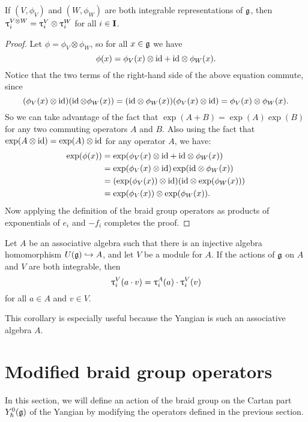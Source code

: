 \begin{proposition}\label{P:tau-tensor}
    If $(V,\phi_V)$ and $(W,\phi_W)$ are both integrable representations of $\g$, then $\braid_i^{V\otimes W} = \braid_i^V\otimes\braid_i^W$ for all $i\in\I$.
\end{proposition}
\begin{proof}
    Let $\phi=\phi_V\otimes\phi_W$, so for all $x\in\g$ we have
    \[\phi(x) = \phi_V(x)\otimes{\id} + {\id}\otimes\phi_W(x).\]
    Notice that the two terms of the right-hand side of the above equation commute, since
    \[(\phi_V(x)\otimes{\id})(\id\otimes\phi_W(x)) = ({\id}\otimes\phi_W(x))(\phi_V(x)\otimes{\id}) = \phi_V(x)\otimes\phi_W(x).\]
    So we can take advantage of the fact that $\exp(A+B)=\exp(A)\exp(B)$ for any two commuting operators $A$ and $B$.
    Also using the fact that $\exp(A\otimes{\id})=\exp(A)\otimes{\id}$ for any operator $A$, we have:
    \begin{align*}
        \exp(\phi(x)) &= \exp(\phi_V(x)\otimes{\id}+{\id}\otimes\phi_W(x)) \\
        &= \exp(\phi_V(x)\otimes{\id})\exp({\id}\otimes\phi_W(x)) \\
        &= (\exp(\phi_V(x))\otimes{\id})({\id}\otimes\exp(\phi_W(x))) \\
        &= \exp(\phi_V(x))\otimes\exp(\phi_W(x)).
    \end{align*}
    Now applying the definition of the braid group operators as products of exponentials of $e_i$ and $-f_i$ completes the proof.
\end{proof}

\begin{corollary}\label{C:tau-alg}
    Let $A$ be an associative algebra such that there is an injective algebra homomorphism $\Ug\inj A$, and let $V$ be a module for $A$.
    If the actions of $\g$ on $A$ and $V$ are both integrable, then
    \[\braid_i^V(a\cdot v) = \braid_i^A(a)\cdot\braid_i^V(v)\]
    for all $a\in A$ and $v\in V$.
\end{corollary}

This corollary is especially useful because the Yangian is such an associative algebra $A$.


\section{Modified braid group operators}\label{sec:mbraid}

In this section, we will define an action of the braid group on the Cartan part $\Yhg[0]$ of the Yangian by modifying the operators defined in the previous section.

